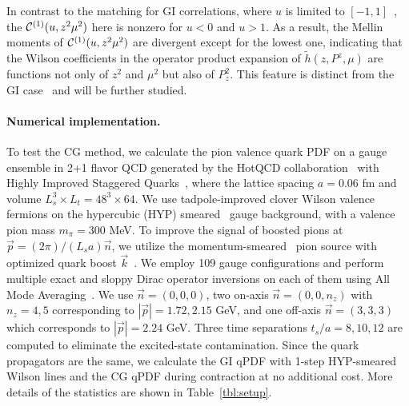 \documentclass[prd,twocolumn,preprintnumbers,showpacs,nofootinbib,superscriptaddress,notitlepage,floatfix]{revtex4-1}
\DeclareRobustCommand{\tbl}[1]{Table~\ref{tbl:#1}}
\begin{document}
In contrast to the matching for GI correlations, where $u$ is limited to $[-1,1]$~\cite{Radyushkin:2017cyf,Ji:2017rah}, the ${\cal C}^{(1)}(u,z^2\mu^2)$ here is nonzero for $u<0$ and $u>1$. As a result, the Mellin moments of ${\cal C}^{(1)}(u,z^2\mu^2)$ are divergent except for the lowest one, indicating that the Wilson coefficients in the operator product expansion of $\tilde h(z,P^z,\mu)$ are functions not only of $z^2$ and $\mu^2$ but also of $P_z^2$. This feature is distinct from the GI case~\cite{Izubuchi:2018srq} and will be further studied.

\paragraph*{Numerical implementation.}
To test the CG method, we calculate the pion valence quark PDF on a gauge ensemble in 2+1 flavor QCD 
generated by the HotQCD collaboration~\cite{HotQCD:2014kol} with
Highly Improved Staggered Quarks~\cite{Follana:2006rc}, where the lattice spacing $a=0.06$ fm and volume $L_s^3\times L_t=48^3 \times 64$. We use tadpole-improved clover Wilson valence fermions 
on the hypercubic (HYP) smeared~\cite{Hasenfratz:2001hp} gauge background, with a valence pion mass $m_\pi=300$ MeV. To improve the signal of boosted pions at $\vec{p}=(2\pi)/(L_sa)\vec{n}$, we utilize the momentum-smeared~\cite{Bali:2016lva} pion source with optimized quark boost $\vec{k}$~\cite{Izubuchi:2019lyk,Gao:2020ito}.
We employ 109 gauge configurations and perform multiple exact and sloppy Dirac operator inversions on each of them using All Mode Averaging~\cite{Shintani:2014vja}. We use $\vec{n}=(0,0,0)$, two on-axis $\vec{n}=(0,0,n_z)$ with $n_z=4,5$ corresponding to $|\vec{p}|=1.72, 2.15$ GeV, and one off-axis $\vec{n}=(3,3,3)$ which corresponds to $|\vec{p}|=2.24$ GeV. Three time separations $t_s/a=8,10,12$ are computed to eliminate the excited-state contamination. Since the quark propagators are the same, we calculate the GI qPDF with 1-step HYP-smeared Wilson lines and the CG qPDF during contraction at no additional cost. More details of the statistics are shown in \tbl{setup}.
\end{document}
